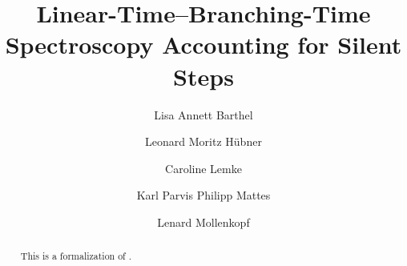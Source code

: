 \documentclass[11pt,a4paper]{article}
\begin{document}
\title{Linear-Time--Branching-Time Spectroscopy Accounting for Silent Steps}
\author{Lisa Annett Barthel \and Leonard Moritz Hübner \and Caroline Lemke \and Karl Parvis Philipp Mattes \and Lenard Mollenkopf}
\maketitle

\begin{abstract}
    This is a formalization of \cite{bisping2023lineartimebranchingtime}.
\end{abstract}

\tableofcontents


















\newpage
\appendix





\end{document}
